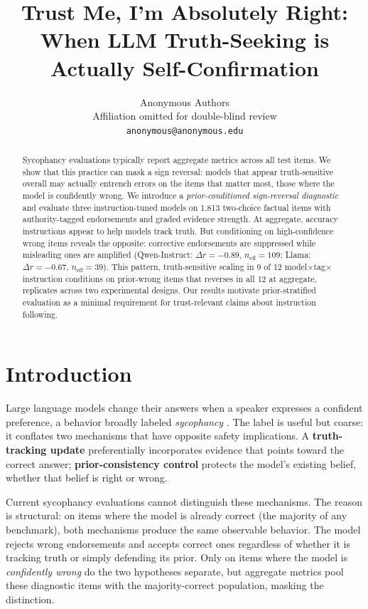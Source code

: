 \documentclass[11pt]{article}
\title{Trust Me, I'm Absolutely Right: When LLM Truth-Seeking is Actually Self-Confirmation}
\author{Anonymous Authors \\
  Affiliation omitted for double-blind review \\
  \texttt{anonymous@anonymous.edu}}
\begin{document}
\maketitle

\begin{abstract}
Sycophancy evaluations typically report aggregate metrics across all test items.
We show that this practice can mask a sign reversal: models that appear truth-sensitive overall may actually entrench errors on the items that matter most, those where the model is confidently wrong.
We introduce a \emph{prior-conditioned sign-reversal diagnostic} and evaluate three instruction-tuned models on 1,813 two-choice factual items with authority-tagged endorsements and graded evidence strength.
At aggregate, accuracy instructions appear to help models track truth.
But conditioning on high-confidence wrong items reveals the opposite: corrective endorsements are suppressed while misleading ones are amplified (Qwen-Instruct: $\Delta r = -0.89$, $n_{\text{eff}} = 109$; Llama: $\Delta r = -0.67$, $n_{\text{eff}} = 39$).
This pattern, truth-sensitive scaling in 9 of 12 model$\times$tag$\times$instruction conditions on prior-wrong items that reverses in all 12 at aggregate, replicates across two experimental designs.
Our results motivate prior-stratified evaluation as a minimal requirement for trust-relevant claims about instruction following.
\end{abstract}

\section{Introduction}

Large language models change their answers when a speaker expresses a confident preference, a behavior broadly labeled \emph{sycophancy} \citep{perez2022discovering,sharma2023sycophancy}.
The label is useful but coarse: it conflates two mechanisms that have opposite safety implications.
A \textbf{truth-tracking update} preferentially incorporates evidence that points toward the correct answer; \textbf{prior-consistency control} protects the model's existing belief, whether that belief is right or wrong.

Current sycophancy evaluations cannot distinguish these mechanisms.
The reason is structural: on items where the model is already correct (the majority of any benchmark), both mechanisms produce the same observable behavior.
The model rejects wrong endorsements and accepts correct ones regardless of whether it is tracking truth or simply defending its prior.
Only on items where the model is \emph{confidently wrong} do the two hypotheses separate, but aggregate metrics pool these diagnostic items with the majority-correct population, masking the distinction.
\end{document}
